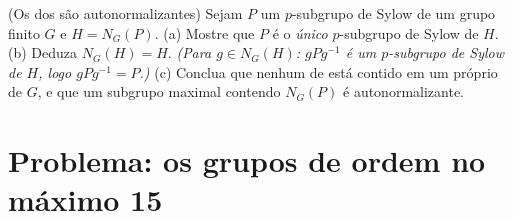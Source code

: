 \begin{exercise}[$\star\star$]\label{exo:b3:groups:12}
(Os  dos  são autonormalizantes) Sejam
$P$ um $p$-subgrupo de Sylow de um grupo finito $G$ e
$H =
N_G(P)$.
(a) Mostre que $P$ é o \emph{único} $p$-subgrupo de Sylow de
$H$.
(b) Deduza $N_G(H) = H$. \emph{(Para $g \in N_G(H)$: $gPg^{-1}$ é um $p$-subgrupo de
Sylow de $H$, logo $gPg^{-1} = P$.)}
(c) Conclua que nenhum  de  está contido
em um  próprio de $G$, e que um subgrupo maximal
contendo $N_G(P)$ é autonormalizante.
\end{exercise}

\section{Problema: os grupos de ordem no máximo 15}

